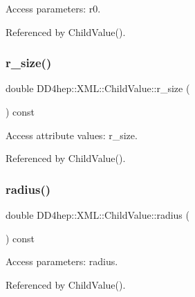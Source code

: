 Access parameters\+: r0. 



Referenced by Child\+Value().

\hypertarget{struct_d_d4hep_1_1_x_m_l_1_1_child_value_aebfd9e77ae3946bb7fc604c86e9355a6}{}\label{struct_d_d4hep_1_1_x_m_l_1_1_child_value_aebfd9e77ae3946bb7fc604c86e9355a6} 
\subsubsection{\texorpdfstring{r\+\_\+size()}{r\_size()}}
{\footnotesize\ttfamily double D\+D4hep\+::\+X\+M\+L\+::\+Child\+Value\+::r\+\_\+size (\begin{DoxyParamCaption}{ }\end{DoxyParamCaption}) const}



Access attribute values\+: r\+\_\+size. 



Referenced by Child\+Value().

\hypertarget{struct_d_d4hep_1_1_x_m_l_1_1_child_value_af4bd6d924d8436f5632cd9baeb86738f}{}\label{struct_d_d4hep_1_1_x_m_l_1_1_child_value_af4bd6d924d8436f5632cd9baeb86738f} 
\subsubsection{\texorpdfstring{radius()}{radius()}}
{\footnotesize\ttfamily double D\+D4hep\+::\+X\+M\+L\+::\+Child\+Value\+::radius (\begin{DoxyParamCaption}{ }\end{DoxyParamCaption}) const}



Access parameters\+: radius. 



Referenced by Child\+Value().

\hypertarget{struct_d_d4hep_1_1_x_m_l_1_1_child_value_a12040c1388e0f8b88d3c75a2901cda7f}{}\label{struct_d_d4hep_1_1_x_m_l_1_1_child_value_a12040c1388e0f8b88d3c75a2901cda7f} 

